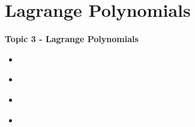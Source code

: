 \documentclass[fleqn]{beamer} %
\newcommand{\sectionIVtitle}{Lagrange Polynomials}
\newcommand{\sectionIIIsubsectionIVtitle}{}
\newcommand{\sectionIVsubsectionItitle}{}
\newcommand{\sectionIVsubsectionIItitle}{}
\newcommand{\sectionIVsubsectionIIItitle}{}
\newcommand{\sectionIVsubsectionIVtitle}{}
\begin{document}
			\begin{frame}
				\frametitle{\sectionIIIsubsectionIVtitle}
				\bigskip


				\btVFill
			\end{frame}	

			\begin{frame}
				\frametitle{\sectionIIIsubsectionIVtitle} \small
				\bigskip


				\btVFill
			\end{frame}	

	
	\section{\sectionIVtitle}\label{sectionIV}

		\begin{frame}
			\large \textbf{Topic 3 - \sectionIVtitle} \vspace{3mm}\\

			\begin{itemize}
				\item \hyperlink{sectionIVsubsectionI}{\sectionIVsubsectionItitle} \vspc %
				\item \hyperlink{sectionIVsubsectionII}{\sectionIVsubsectionIItitle} \vspc %
				\item \hyperlink{sectionIVsubsectionIII}{\sectionIVsubsectionIIItitle} \vspc %
				\item \hyperlink{sectionIVsubsectionIV}{\sectionIVsubsectionIVtitle} \vspc %
			\end{itemize}

		\end{frame}

		\subsection{\sectionIVsubsectionItitle}\label{sectionIVsubsectionI}

			\begin{frame}
				\frametitle{\sectionIVsubsectionItitle}
				\bigskip

		
				\btVFill
			\end{frame}

		\subsection{\sectionIVsubsectionIItitle}\label{sectionIVsubsectionII}
\end{document}
